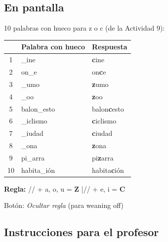 \documentclass[a4paper,11pt]{article}
\begin{document}
\subsection*{En pantalla}

10 palabras con hueco para z o c (de la Actividad 9):

\begin{center}
\renewcommand{\arraystretch}{1.5}
\begin{tabular}{|c|>{\centering\arraybackslash}p{4cm}|>{\centering\arraybackslash}p{4cm}|}
\hline
\rowcolor{gris}
 & \textbf{Palabra con hueco} & \textbf{Respuesta} \\
\hline
1 & \_ine & \textbf{c}ine \\
\hline
2 & on\_e & on\textbf{c}e \\
\hline
3 & \_umo & \textbf{z}umo \\
\hline
4 & \_oo & \textbf{z}oo \\
\hline
5 & balon\_esto & balon\textbf{c}esto \\
\hline
6 & \_iclismo & \textbf{c}iclismo \\
\hline
7 & \_iudad & \textbf{c}iudad \\
\hline
8 & \_ona & \textbf{z}ona \\
\hline
9 & pi\_arra & pi\textbf{z}arra \\
\hline
10 & habita\_ión & habita\textbf{c}ión \\
\hline
\end{tabular}
\end{center}

\vspace{0.3cm}

\noindent\colorbox{verde!15}{\parbox{\dimexpr\linewidth-2\fboxsep}{%
\centering\textbf{Regla:} /\texttheta/ + a, o, u = \textbf{Z} \quad|\quad /\texttheta/ + e, i = \textbf{C}
}}

\vspace{0.3cm}

Botón: \textit{Ocultar regla} (para weaning off)

\vspace{0.5cm}

\subsection*{Instrucciones para el profesor}
\end{document}
